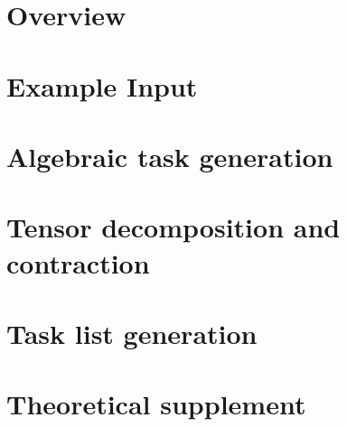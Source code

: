 \documentclass[12pt]{report}
\begin{document}
\tableofcontents

\chapter{Overview}


\chapter{Example Input}


\chapter{Algebraic task generation}


\chapter{Tensor decomposition and contraction}


\chapter{Task list generation}


\chapter{Theoretical supplement}


{}

\end{document}
